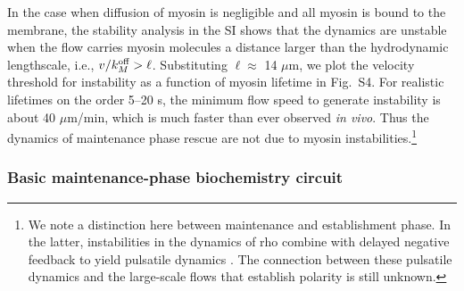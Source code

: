 \documentclass[11pt]{article}
\newcommand{\6}[1]{#1_{\text{6}}}
\newcommand{\3}[1]{#1_{\text{3}}}
\begin{document}
In the case when diffusion of myosin is negligible and all myosin is bound to the membrane, the stability analysis in the SI shows that the dynamics are unstable when the flow carries myosin molecules a distance larger than the hydrodynamic lengthscale, i.e., $v / k^\text{off}_M > \ell$. Substituting $\ell \approx$ 14 $\mu$m, we plot the velocity threshold for instability as a function of myosin lifetime in Fig.\ S4. For realistic lifetimes on the order 5--20 s, the minimum flow speed to generate instability is about 40 $\mu$m/min, which is much faster than ever observed \emph{in vivo}. Thus the dynamics of maintenance phase rescue are not due to myosin instabilities.\footnote{We note a distinction here between maintenance and establishment phase. In the latter, instabilities in the dynamics of rho combine with delayed negative feedback to yield pulsatile dynamics \citep{nishikawa2017controlling, michaux2018excitable, michaud2022versatile}. The connection between these pulsatile dynamics and the large-scale flows that establish polarity is still unknown.}


\subsubsection{Basic maintenance-phase biochemistry circuit \label{sec:BCOnly}}
\end{document}
